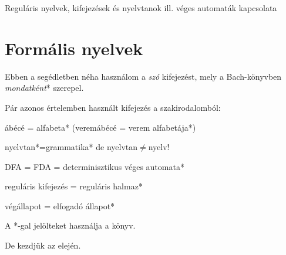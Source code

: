 \documentclass[a4paper]{article}
\begin{document}
{Reguláris nyelvek, kifejezések és nyelvtanok ill. véges automaták
kapcsolata}


\newpage

\section{Formális nyelvek}

Ebben a segédletben néha használom a \emph{szó} kifejezést, mely a
Bach-könyvben \emph{mondatként}* szerepel.

Pár azonos értelemben használt kifejezés a szakirodalomból:

ábécé = alfabeta* (veremábécé = verem alfabetája*)

nyelvtan*=grammatika* de nyelvtan$\neq$nyelv!

DFA = FDA = determinisztikus véges automata*

reguláris kifejezés = reguláris halmaz*

végállapot = elfogadó állapot*

A *-gal jelölteket használja a könyv.

De kezdjük az elején.
\end{document}

